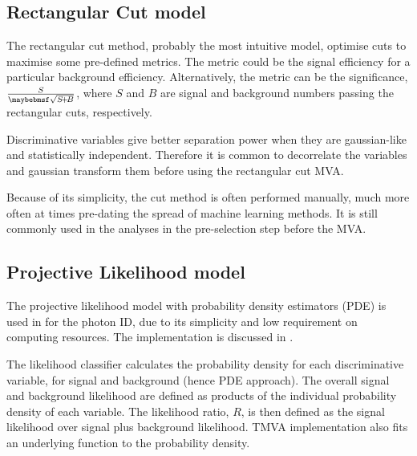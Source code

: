 
\subsection{Rectangular Cut model}

The rectangular cut method, probably the most intuitive model, optimise cuts to maximise some pre-defined metrics. The metric could be the signal efficiency for a particular background efficiency. Alternatively, the metric can be the significance, $\frac{S}{\rootOf{S\!+\!B}}$, where $S$ and $B$ are signal and background numbers passing the rectangular cuts, respectively.
 
Discriminative variables give better separation power when they are gaussian-like and statistically independent. Therefore it is common to decorrelate  the variables and gaussian transform them before using the rectangular cut MVA.

Because of its simplicity, the cut method is often performed manually, much more often at times pre-dating the spread of machine learning methods. It is still commonly used in the analyses in  the pre-selection step before the MVA.

\subsection{Projective Likelihood model}
\label{sec:pandoraLikelihood}

The projective likelihood model with probability density estimators (PDE) is used in \pandora for the photon ID,  due to its simplicity and low requirement on computing resources. The \pandora implementation is discussed  in .

The likelihood classifier calculates the probability density for each discriminative variable, for signal and background (hence PDE approach). The overall signal and background likelihood are defined as products of the individual probability density of each variable. The likelihood ratio, $R$, is then defined as the signal likelihood over signal plus background likelihood. TMVA implementation also fits an underlying function to the probability density.


